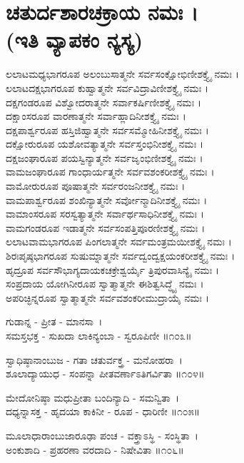 \section{ಚತುರ್ದಶಾರಚಕ್ರಾಯ ನಮಃ ।\\ (ಇತಿ ವ್ಯಾಪಕಂ ನ್ಯಸ್ಯ)}
ಲಲಾಟಮಧ್ಯಭಾಗರೂಪ ಅಲಂಬುಸಾತ್ಮನೇ ಸರ್ವಸಂಕ್ಷೋಭಿಣೀಶಕ್ತ್ಯೈ ನಮಃ ।\\
ಲಲಾಟದಕ್ಷಭಾಗರೂಪ ಕುಹ್ವಾತ್ಮನೇ ಸರ್ವವಿದ್ರಾವಿಣೀಶಕ್ತ್ಯೈ ನಮಃ ।\\
ದಕ್ಷಗಂಡರೂಪ ವಿಶ್ವೋದರಾತ್ಮನೇ ಸರ್ವಾಕರ್ಷಿಣೀಶಕ್ತ್ಯೈ ನಮಃ ।\\
ದಕ್ಷಾಂಸರೂಪ ವಾರಣಾತ್ಮನೇ ಸರ್ವಾಹ್ಲಾದಿನೀಶಕ್ತ್ಯೈ ನಮಃ ।\\
ದಕ್ಷಪಾರ್ಶ್ವರೂಪ ಹಸ್ತಿಜಿಹ್ವಾತ್ಮನೇ ಸರ್ವಸಮ್ಮೋಹಿನೀಶಕ್ತ್ಯೈ ನಮಃ ।\\
ದಕ್ಷೋರುರೂಪ ಯಶೋವತ್ಯಾತ್ಮನೇ ಸರ್ವಸ್ತಂಭಿನೀಶಕ್ತ್ಯೈ ನಮಃ ।\\
ದಕ್ಷಜಂಘಾರೂಪ ಪಯಸ್ವಿನ್ಯಾತ್ಮನೇ ಸರ್ವಜೃಂಭಿಣೀಶಕ್ತ್ಯೈ ನಮಃ ।\\
ವಾಮಜಂಘಾರೂಪ ಗಾಂಧಾರ್ಯತ್ಮನೇ ಸರ್ವವಶಂಕರೀಶಕ್ತ್ಯೈ ನಮಃ ।\\
ವಾಮೋರುರೂಪ ಪೂಷಾತ್ಮನೇ ಸರ್ವರಂಜನೀಶಕ್ತ್ಯೈ ನಮಃ ।\\
ವಾಮಪಾರ್ಶ್ವರೂಪ ಶಂಖಿನ್ಯಾತ್ಮನೇ ಸರ್ವೋನ್ಮಾದಿನೀಶಕ್ತ್ಯೈ ನಮಃ ।\\
ವಾಮಾಂಸರೂಪ ಸರಸ್ವತ್ಯಾತ್ಮನೇ ಸರ್ವಾರ್ಥಸಾಧಿನೀಶಕ್ತ್ಯೈ ನಮಃ ।\\
ವಾಮಗಂಡರೂಪ ಇಡಾತ್ಮನೇ ಸರ್ವಸಂಪತ್ತಿಪೂರಣೀಶಕ್ತ್ಯೈ ನಮಃ ।\\
ಲಲಾಟವಾಮಭಾಗರೂಪ ಪಿಂಗಲಾತ್ಮನೇ ಸರ್ವಮಂತ್ರಮಯೀಶಕ್ತ್ಯೈ ನಮಃ ।\\
ಶಿರಃಪೃಷ್ಠಭಾಗರೂಪ ಸುಷುಮ್ನಾತ್ಮನೇ ಸರ್ವದ್ವಂದ್ವಕ್ಷಯಂಕರೀಶಕ್ತ್ಯೈ ನಮಃ ।\\
ಹೃದ್ರೂಪ ಸರ್ವಸೌಭಾಗ್ಯದಾಯಕಚಕ್ರೇಶ್ವರ್ಯೈ ತ್ರಿಪುರವಾಸಿನ್ಯೈ ನಮಃ ।\\
ಸಂಪ್ರದಾಯ ಯೋಗಿನೀರೂಪ ಸ್ವಾತ್ಮಾತ್ಮನೇ ಈಶಿತ್ವಸಿದ್ಧ್ಯೈ ನಮಃ ।\\
ಅಪರಿಚ್ಛಿನ್ನರೂಪ ಸ್ವಾತ್ಮಾತ್ಮನೇ ಸರ್ವವಶಂಕರೀಮುದ್ರಾಯೈ ನಮಃ ।

 ಗುಡಾನ್ನ - ಪ್ರೀತ - ಮಾನಸಾ~।\\
ಸಮಸ್ತಭಕ್ತ - ಸುಖದಾ ಲಾಕಿನ್ಯಂಬಾ - ಸ್ವರೂಪಿಣೀ ॥೧೦೩॥

ಸ್ವಾಧಿಷ್ಠಾನಾಂಬುಜ - ಗತಾ ಚತುರ್ವಕ್ತ್ರ - ಮನೋಹರಾ~।\\
ಶೂಲಾದ್ಯಾಯುಧ - ಸಂಪನ್ನಾ ಪೀತವರ್ಣಾಽತಿಗರ್ವಿತಾ ॥೧೦೪॥

ಮೇದೋನಿಷ್ಠಾ ಮಧುಪ್ರೀತಾ ಬಂದಿನ್ಯಾದಿ - ಸಮನ್ವಿತಾ~।\\
ದಧ್ಯನ್ನಾಸಕ್ತ - ಹೃದಯಾ ಕಾಕಿನೀ - ರೂಪ - ಧಾರಿಣೀ ॥೧೦೫॥

ಮೂಲಾಧಾರಾಂಬುಜಾರೂಢಾ ಪಂಚ - ವಕ್ತ್ರಾಽಸ್ಥಿ - ಸಂಸ್ಥಿತಾ~।\\
ಅಂಕುಶಾದಿ - ಪ್ರಹರಣಾ ವರದಾದಿ - ನಿಷೇವಿತಾ ॥೧೦೬॥

